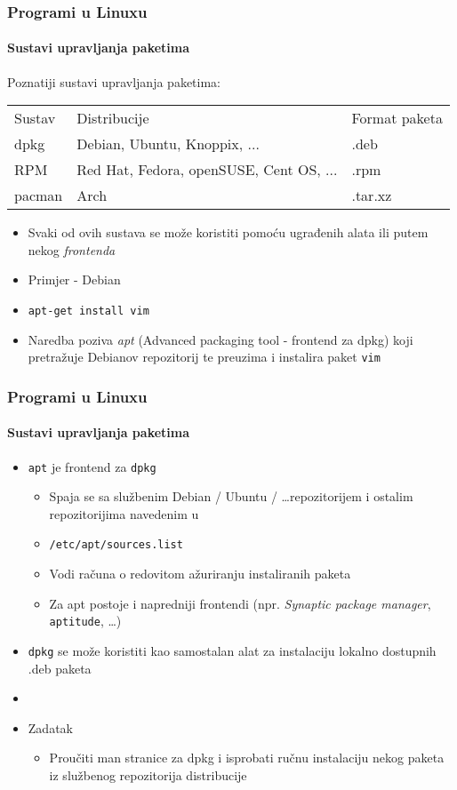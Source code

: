 \documentclass[table,usenames,dvipsnames]{beamer}
\newcommand{\shell}[1]{\texttt{#1}}
\begin{document}
\begin{frame}[t]
	\frametitle{Programi u Linuxu}
	\framesubtitle{Sustavi upravljanja paketima}
	Poznatiji sustavi upravljanja paketima:
	\begin{table}[h]
		\begin{tabular}{l l l}
			\rowcolor{BlueViolet!20} Sustav & Distribucije & Format paketa \\
			dpkg & Debian, Ubuntu, Knoppix, ... & .deb \\
			RPM & Red Hat, Fedora, openSUSE, Cent OS, ... & .rpm \\
			pacman & Arch & .tar.xz \\
		\end{tabular}
	\end{table}
	\begin{itemize}
		\item Svaki od ovih sustava se može koristiti pomoću ugrađenih alata ili putem nekog \emph{frontenda}
		\item Primjer - Debian
		\item[] \shell{apt-get install vim}
		\item[] \small Naredba poziva \emph{apt} (Advanced packaging tool - frontend za dpkg) koji pretražuje Debianov repozitorij te preuzima i instalira paket \shell{vim}
	\end{itemize}
\end{frame}


\begin{frame}[t]
	\frametitle{Programi u Linuxu}
	\framesubtitle{Sustavi upravljanja paketima}
	\begin{itemize}
		\item \shell{apt} je frontend za \shell{dpkg}
		\begin{itemize}
			\item Spaja se sa službenim Debian / Ubuntu / \ldots repozitorijem i ostalim repozitorijima navedenim u
			\item[] \shell{/etc/apt/sources.list}
			\item Vodi računa o redovitom ažuriranju instaliranih paketa
			\item Za apt postoje i napredniji frontendi (npr. \emph{Synaptic package manager}, \shell{aptitude}, \ldots)
		\end{itemize}
		\item \shell{dpkg} se može koristiti kao samostalan alat za instalaciju lokalno dostupnih .deb paketa
		\item[]
		\item Zadatak
		\begin{itemize}
			\item Proučiti man stranice za dpkg i isprobati ručnu instalaciju nekog paketa iz službenog repozitorija distribucije
		\end{itemize}
	\end{itemize}
\end{frame}
\end{document}
